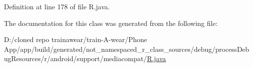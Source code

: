 Definition at line 178 of file R.\+java.



The documentation for this class was generated from the following file\+:\begin{DoxyCompactItemize}
\item 
D\+:/cloned repo trainawear/train-\/\+A-\/wear/\+Phone App/app/build/generated/not\+\_\+namespaced\+\_\+r\+\_\+class\+\_\+sources/debug/process\+Debug\+Resources/r/android/support/mediacompat/\mbox{\hyperlink{process_debug_resources_2r_2android_2support_2mediacompat_2_r_8java}{R.\+java}}\end{DoxyCompactItemize}
